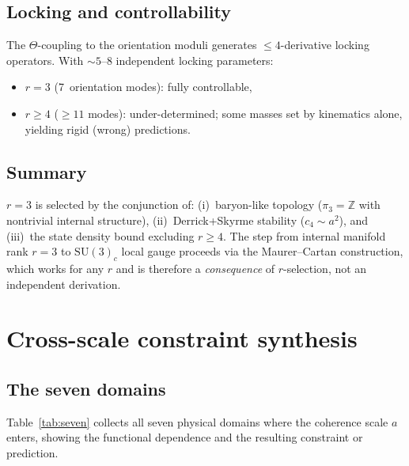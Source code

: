 ﻿\documentclass[a4paper,12pt]{article}
\begin{document}
\subsection{Locking and controllability}

The $\Theta$-coupling to the orientation moduli generates $\leq 4$-derivative
locking operators.  With $\sim 5$--$8$ independent locking parameters:
\begin{itemize}
  \item $r=3$ (7~orientation modes): fully controllable,
  \item $r\geq 4$ ($\geq 11$ modes): under-determined; some masses
    set by kinematics alone, yielding rigid (wrong) predictions.
\end{itemize}

\subsection{Summary}

$r=3$ is selected by the conjunction of: (i)~baryon-like topology
($\pi_3=\mathbb{Z}$ with nontrivial internal structure),
(ii)~Derrick+Skyrme stability ($c_4\sim a^2$), and (iii)~the state
density bound excluding $r\geq 4$.  The step from internal manifold
rank $r=3$ to $\mathrm{SU}(3)_c$ local gauge proceeds via the
Maurer--Cartan construction, which works for any $r$ and is therefore a
\emph{consequence} of $r$-selection, not an independent derivation.

\section{Cross-scale constraint synthesis}
\label{sec:synthesis}

\subsection{The seven domains}

Table~\ref{tab:seven} collects all seven physical domains where the
coherence scale $a$ enters, showing the functional dependence and the
resulting constraint or prediction.
\end{document}
